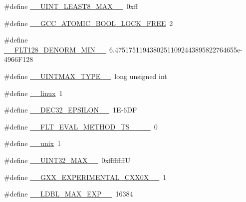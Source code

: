 \begin{DoxyCompactItemize}
\item 
\#define \hyperlink{cmake-build-debug_2babel__client__autogen_2moc__predefs_8h_aaf06a1464d33431377a2ee5293ec70d2}{\+\_\+\+\_\+\+U\+I\+N\+T\+\_\+\+L\+E\+A\+S\+T8\+\_\+\+M\+A\+X\+\_\+\+\_\+}~0xff
\item 
\#define \hyperlink{cmake-build-debug_2babel__client__autogen_2moc__predefs_8h_a9685ff8e617f3c5892c2a6fe3484f3b7}{\+\_\+\+\_\+\+G\+C\+C\+\_\+\+A\+T\+O\+M\+I\+C\+\_\+\+B\+O\+O\+L\+\_\+\+L\+O\+C\+K\+\_\+\+F\+R\+EE}~2
\item 
\#define \hyperlink{cmake-build-debug_2babel__client__autogen_2moc__predefs_8h_a960cb27a87591af89eddb328647f1534}{\+\_\+\+\_\+\+F\+L\+T128\+\_\+\+D\+E\+N\+O\+R\+M\+\_\+\+M\+I\+N\+\_\+\+\_\+}~6.\+47517511943802511092443895822764655e-\/4966\+F128
\item 
\#define \hyperlink{cmake-build-debug_2babel__client__autogen_2moc__predefs_8h_ab86380373ae9fa385c8a2464023774a8}{\+\_\+\+\_\+\+U\+I\+N\+T\+M\+A\+X\+\_\+\+T\+Y\+P\+E\+\_\+\+\_\+}~long unsigned int
\item 
\#define \hyperlink{cmake-build-debug_2babel__client__autogen_2moc__predefs_8h_a6c6342c53a7213211680dc5caae14491}{\+\_\+\+\_\+linux}~1
\item 
\#define \hyperlink{cmake-build-debug_2babel__client__autogen_2moc__predefs_8h_a13526b223391d4982c4c172c29bfdc1e}{\+\_\+\+\_\+\+D\+E\+C32\+\_\+\+E\+P\+S\+I\+L\+O\+N\+\_\+\+\_\+}~1\+E-\/6\+DF
\item 
\#define \hyperlink{cmake-build-debug_2babel__client__autogen_2moc__predefs_8h_af635b5d104ef9858a68ab2c56677fd2d}{\+\_\+\+\_\+\+F\+L\+T\+\_\+\+E\+V\+A\+L\+\_\+\+M\+E\+T\+H\+O\+D\+\_\+\+T\+S\+\_\+\_\+\_\+\+\_\+}~0
\item 
\#define \hyperlink{cmake-build-debug_2babel__client__autogen_2moc__predefs_8h_ac3cd8b035cfb8a68f6d1119ace36f1cc}{\+\_\+\+\_\+unix}~1
\item 
\#define \hyperlink{cmake-build-debug_2babel__client__autogen_2moc__predefs_8h_ab4425dccbcddb2363a2a8a67367a5b42}{\+\_\+\+\_\+\+U\+I\+N\+T32\+\_\+\+M\+A\+X\+\_\+\+\_\+}~0xffffffffU
\item 
\#define \hyperlink{cmake-build-debug_2babel__client__autogen_2moc__predefs_8h_a213133a8dca206becf88c2e3523b124a}{\+\_\+\+\_\+\+G\+X\+X\+\_\+\+E\+X\+P\+E\+R\+I\+M\+E\+N\+T\+A\+L\+\_\+\+C\+X\+X0\+X\+\_\+\+\_\+}~1
\item 
\#define \hyperlink{cmake-build-debug_2babel__client__autogen_2moc__predefs_8h_ae221a8e373285cf10c22926762f477f5}{\+\_\+\+\_\+\+L\+D\+B\+L\+\_\+\+M\+A\+X\+\_\+\+E\+X\+P\+\_\+\+\_\+}~16384

\end{DoxyCompactItemize}
